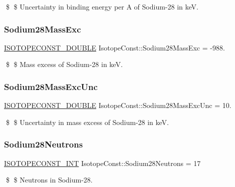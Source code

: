 \$ \$ Uncertainty in binding energy per A of Sodium-\/28 in keV. \mbox{\label{group___isotope_const-_sodium-_na28_ga67e9ff7359da6b712f01c7f16f9537dc}} 
\subsubsection{\texorpdfstring{Sodium28\+Mass\+Exc}{Sodium28MassExc}}
{\footnotesize\ttfamily \mbox{\hyperlink{group___isotope_const-_macros_ga8f45a7272ce02c0b4c65c44636ed719a}{I\+S\+O\+T\+O\+P\+E\+C\+O\+N\+S\+T\+\_\+\+D\+O\+U\+B\+LE}} Isotope\+Const\+::\+Sodium28\+Mass\+Exc = -\/988.}

\$ \$ Mass excess of Sodium-\/28 in keV. \mbox{\label{group___isotope_const-_sodium-_na28_gaf4cf7856b11f47d57e29474a561e7241}} 
\subsubsection{\texorpdfstring{Sodium28\+Mass\+Exc\+Unc}{Sodium28MassExcUnc}}
{\footnotesize\ttfamily \mbox{\hyperlink{group___isotope_const-_macros_ga8f45a7272ce02c0b4c65c44636ed719a}{I\+S\+O\+T\+O\+P\+E\+C\+O\+N\+S\+T\+\_\+\+D\+O\+U\+B\+LE}} Isotope\+Const\+::\+Sodium28\+Mass\+Exc\+Unc = 10.}

\$ \$ Uncertainty in mass excess of Sodium-\/28 in keV. \mbox{\label{group___isotope_const-_sodium-_na28_gaf19b2a3f16531a5615f67006f0ca834c}} 
\subsubsection{\texorpdfstring{Sodium28\+Neutrons}{Sodium28Neutrons}}
{\footnotesize\ttfamily \mbox{\hyperlink{group___isotope_const-_macros_ga5f18360b3e99483a35c32d789e62621c}{I\+S\+O\+T\+O\+P\+E\+C\+O\+N\+S\+T\+\_\+\+I\+NT}} Isotope\+Const\+::\+Sodium28\+Neutrons = 17}

\$ \$ Neutrons in Sodium-\/28. \mbox{\label{group___isotope_const-_sodium-_na28_ga1fd3a72e781d1b421cd57457939b7015}} 
